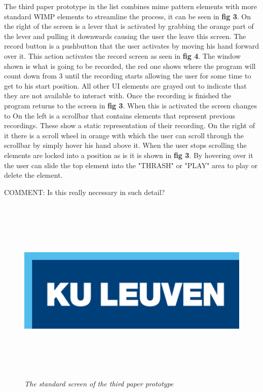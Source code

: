 The third paper prototype in the list combines mime pattern elements with more standard WIMP elements to streamline the process, it can be seen in \textbf{ fig 3}. On the right of the screen is a lever that is activated by grabbing the orange part of the lever and pulling it downwards causing the user the leave this screen. The record button is a pushbutton that the user activates by moving his hand forward over it. This action activates the record screen as seen in \textbf{ fig 4}. The window shown is what is going to be recorded, the red one shows where the program will count down from 3 until the recording starts allowing the user for some time to get to his start position. All other UI elements are grayed out to indicate that they are not available to interact with. Once the recording is finished the program returns to the screen in \textbf{ fig 3}. When this is activated the screen changes to  On the left is a scrollbar that contains elements that represent previous recordings. These show a static representation of their recording. On the right of it there is a scroll wheel in orange with which the user can scroll through the scrollbar by simply hover his hand above it. When the user stops scrolling the elements are locked into a position as is it is shown in \textbf{ fig 3}. By hovering over it the user can slide the top element into the "THRASH" or "PLAY" area to play or delete the element. 

{\large COMMENT: Is this really necessary in such detail?}

\begin{figure}[H]
	\begin{center}
		\includegraphics[width=16cm, height=9cm]{KUL.png}
		\caption{\emph{The standard screen of the third paper prototype}}
		\label{The standard screen of the third paper prototype}
	\end{center}
\end{figure}

